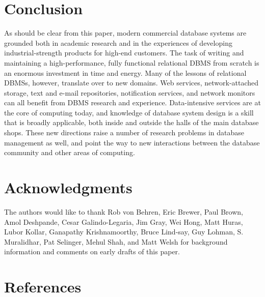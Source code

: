 \documentclass[b5paper,11pt,twoside,openright]{book}
\begin{document}
\hypertarget{conclusion}{%
\chapter{Conclusion}\label{conclusion}}

As should be clear from this paper, modern commercial database systems
are grounded both in academic research and in the experiences of
developing industrial-strength products for high-end customers. The task
of writing and maintaining a high-performance, fully functional
relational DBMS from scratch is an enormous investment in time and
energy. Many of the lessons of relational DBMSs, however, translate over
to new domains. Web services, network-attached storage, text and e-mail
repositories, notification services, and network monitors can all
benefit from DBMS research and experience. Data-intensive services are
at the core of computing today, and knowledge of database system design
is a skill that is broadly applicable, both inside and outside the halls
of the main database shops. These new directions raise a number of
research problems in database management as well, and point the way to
new interactions between the database community and other areas of
computing.

\hypertarget{acknowledgments}{%
\chapter*{Acknowledgments}\label{acknowledgments}}

The authors would like to thank Rob von Behren, Eric Brewer, Paul Brown,
Amol Deshpande, Cesar Galindo-Legaria, Jim Gray, Wei Hong, Matt Huras,
Lubor Kollar, Ganapathy Krishnamoorthy, Bruce Lind-say, Guy Lohman, S.
Muralidhar, Pat Selinger, Mehul Shah, and Matt Welsh for background
information and comments on early drafts of this paper.

\hypertarget{references}{%
\chapter*{References}\label{references}}
\end{document}
